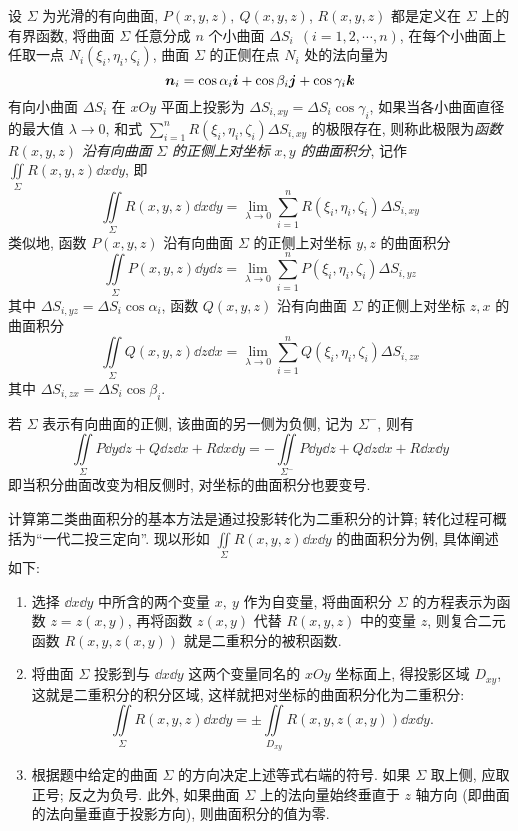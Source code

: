 \begin{definition}
    设 $\varSigma$ 为光滑的有向曲面, $P(x,y,z),~Q(x,y,z)$, $R(x,y,z)$ 都是定义在 $\varSigma$ 上的有界函数, 将曲面 $\varSigma$ 任意分成 $n$ 个小曲面 $\Delta S_i~~(i=1,2,\cdots,n)$, 在每个小曲面上任取一点 $N_i(\xi_i,\eta_i,\zeta_i)$,
    曲面 $\varSigma$ 的正侧在点 $N_i$ 处的法向量为 $$\vb*{n}_i=\cos\alpha_i\vb*{i}+\cos\beta_i\vb*{j}+\cos\gamma_i\vb*{k}$$
    有向小曲面 $\Delta S_i$ 在 $xOy$ 平面上投影为 $\Delta S_{i,xy}=\Delta S_i\cos\gamma_i$, 如果当各小曲面直径的最大值 $\lambda\to0$, 和式 $\displaystyle\sum_{i=1}^{n}R(\xi_i,\eta_i,\zeta_i)\Delta S_{i,xy}$ 的极限存在,
    则称此极限为\textit{函数} $R(x,y,z)$ \textit{沿有向曲面} $\varSigma$ \textit{的正侧上对坐标} $x,y$ \textit{的曲面积分}, 记作 $\displaystyle\iint\limits_\varSigma R(x,y,z)\dd x\dd y$, 即
    $$\iint\limits_\varSigma R(x,y,z)\dd x\dd y=\lim_{\lambda\to0}\sum_{i=1}^{n}R(\xi_i,\eta_i,\zeta_i)\Delta S_{i,xy}$$
    类似地, 函数 $P(x,y,z)$ 沿有向曲面 $\varSigma$ 的正侧上对坐标 $y,z$ 的曲面积分
    $$\iint\limits_\varSigma P(x,y,z)\dd y\dd z=\lim_{\lambda\to0}\sum_{i=1}^{n}P(\xi_i,\eta_i,\zeta_i)\Delta S_{i,yz}$$
    其中 $\Delta S_{i,yz}=\Delta S_{i}\cos\alpha_i$,
    函数 $Q(x,y,z)$ 沿有向曲面 $\varSigma$ 的正侧上对坐标 $z,x$ 的曲面积分
    $$\iint\limits_\varSigma Q(x,y,z)\dd z\dd x=\lim_{\lambda\to0}\sum_{i=1}^{n}Q(\xi_i,\eta_i,\zeta_i)\Delta S_{i,zx}$$
    其中 $\Delta S_{i,zx}=\Delta S_{i}\cos\beta_i$.
\end{definition}

\begin{theorem}
    若 $\varSigma$ 表示有向曲面的正侧, 该曲面的另一侧为负侧, 记为 $\varSigma^-$, 则有
    $$\iint\limits_\varSigma P\dd y\dd z+Q\dd z\dd x+R\dd x\dd y=-\iint\limits_{\varSigma^-} P\dd y\dd z+Q\dd z\dd x+R\dd x\dd y$$
    即当积分曲面改变为相反侧时, 对坐标的曲面积分也要变号.
\end{theorem}

计算第二类曲面积分的基本方法是通过投影转化为二重积分的计算; 转化过程可概括为“一代二投三定向”.
现以形如 $\displaystyle\iint\limits_\varSigma R(x,y,z)\dd x\dd y$ 的曲面积分为例, 具体阐述如下:
\begin{enumerate}[label=(\arabic{*})]
    \item 选择 $\dd x\dd y$ 中所含的两个变量 $x,~y$ 作为自变量, 将曲面积分 $\varSigma$ 的方程表示为函数 $z=z(x,y)$, 再将函数 $z(x,y)$ 代替 $R(x,y,z)$ 中的变量 $z$, 则复合二元函数 $R(x,y,z(x,y))$ 就是二重积分的被积函数.
    \item 将曲面 $\varSigma$ 投影到与 $\dd x\dd y$ 这两个变量同名的 $xOy$ 坐标面上, 得投影区域 $D_{xy}$, 这就是二重积分的积分区域, 这样就把对坐标的曲面积分化为二重积分:
          $$\iint\limits_\varSigma R(x,y,z)\dd x\dd y=\pm\iint\limits_{D_{xy}}R(x,y,z(x,y))\dd x\dd y.$$
    \item 根据题中给定的曲面 $\varSigma$ 的方向决定上述等式右端的符号. 如果 $\varSigma$ 取上侧, 应取正号; 反之为负号. 此外, 如果曲面 $\varSigma$ 上的法向量始终垂直于 $z$ 轴方向 (即曲面的法向量垂直于投影方向), 则曲面积分的值为零.
\end{enumerate}

